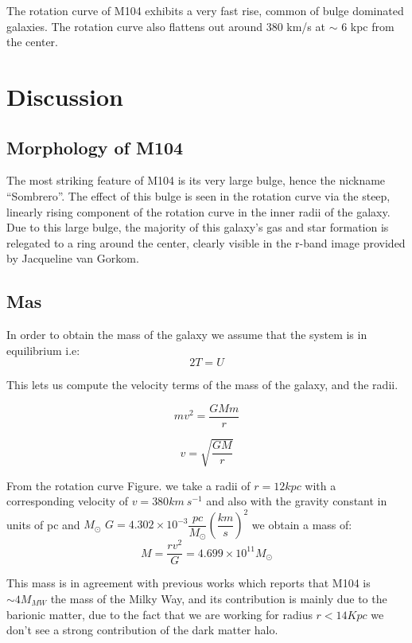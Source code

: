 \documentclass[12pt]{article}
\begin{document}
The rotation curve of M104 exhibits a very fast rise, common of bulge
dominated galaxies. The rotation curve also flattens out around 380
km/s at $\sim$ 6 kpc from the center. 

\section{Discussion}

\subsection{Morphology of M104}

The most striking feature of M104 is its very large bulge, hence the
nickname ``Sombrero''. The effect of this bulge is seen in the
rotation curve via the steep, linearly rising component of the
rotation curve in the inner radii of the galaxy. Due to this large
bulge, the majority of this galaxy's gas and star formation is
relegated to a ring around the center, clearly visible in the r-band
image provided by Jacqueline van Gorkom.

\subsection{Mas}

In order to obtain the mass of the galaxy we assume that the system 
is in equilibrium i.e:
\begin{equation}
2T = U
\end{equation}

This lets us compute the velocity terms of the mass of the galaxy, and the radii.

\begin{equation}
mv^{2} = \dfrac{GMm}{r}
\end{equation}

\begin{equation}
v = \sqrt{\dfrac{GM}{r}}
\end{equation}

From the rotation curve Figure. we take a radii of $r = 12 kpc$ with a corresponding
velocity of $v=380 km\ s^{-1}$ and also with the gravity constant in units of pc and
$M_{\odot}$ $G = 4.302\times 10^{-3} \dfrac{pc}{M_{\odot}} (\dfrac{km}{s})^{2}$ we obtain 
a mass of:\\
 
\begin{equation}
M = \dfrac{rv^{2}}{G} = 4.699\times 10^{11} M_{\odot}
\end{equation}

This mass is in agreement with previous works which reports that M104 is $ \sim 4 M_{MW}$
the mass of the Milky Way, and its contribution is mainly due 
to the barionic matter, due to the fact that we are working for radius $r < 14Kpc$
we don't see a strong contribution of the dark matter halo. 
\end{document}
